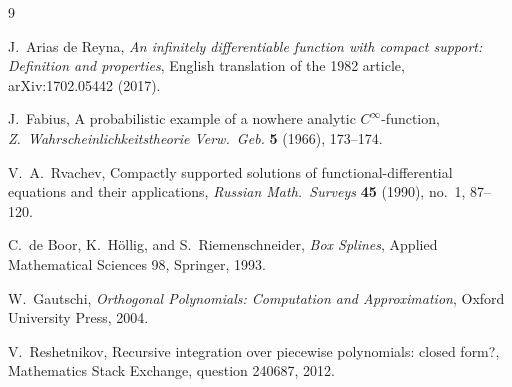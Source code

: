 \documentclass[11pt,oneside]{article}
\numberwithin{equation}{section}
\theoremstyle{definition}
\theoremstyle{remark}
\newcommand{\repo}{\textsc{ProveIt}}
\begin{document}
\begin{thebibliography}{9}

J.~Arias de Reyna,
\newblock \emph{An infinitely differentiable function with compact
support: Definition and properties}, English translation of the 1982
article, arXiv:1702.05442 (2017).

J.~Fabius,
\newblock A probabilistic example of a nowhere analytic
$C^\infty$-function,
\newblock \emph{Z.~Wahrscheinlichkeitstheorie Verw.~Geb.}
\textbf{5} (1966), 173--174.

V.~A.~Rvachev,
\newblock Compactly supported solutions of functional-differential
equations and their applications,
\newblock \emph{Russian Math.~Surveys} \textbf{45} (1990), no.~1,
87--120.

C.~de Boor, K.~H\"ollig, and S.~Riemenschneider,
\newblock \emph{Box Splines}, Applied Mathematical Sciences 98,
Springer, 1993.

W.~Gautschi,
\newblock \emph{Orthogonal Polynomials: Computation and
Approximation}, Oxford University Press, 2004.

V.~Reshetnikov,
\newblock Recursive integration over piecewise polynomials: closed
form?,
\newblock Mathematics Stack Exchange, question 240687, 2012.

\end{thebibliography}



\newcommand{\eps}{\varepsilon}
\newcommand{\pos}[1]{\left(#1\right)_{+}}
\newcommand{\KL}{\operatorname{D}}
\newcommand{\Ent}{\operatorname{h}}
\newcommand{\Fish}{\operatorname{I}}
\newcommand{\baseline}{\textcolor{linkblue}{\textsf{baseline}}}
\newcommand{\newresult}{\textcolor{deepgreen}{\textsf{proved here}}}
\newcommand{\conjstatus}{\textcolor{deepred}{\textsf{conjectural}}}
\renewcommand{\repo}{\nolinkurl{Analysis/FabiusFunction/docs}}
\newenvironment{proofidea}{\par\smallskip\noindent\textit{Proof architecture.}\ }{\hfill\(\square\)\par\smallskip}
\newenvironment{boxedremark}{%
  \par\smallskip\noindent\begin{center}\begin{minipage}{0.94\textwidth}%
  \color{black}\hrule\vspace{0.6em}\small
}{%
  \vspace{0.6em}\hrule\end{minipage}\end{center}\smallskip
}
\setcounter{section}{0}
\renewcommand{\thesection}{\arabic{section}}
\end{document}
